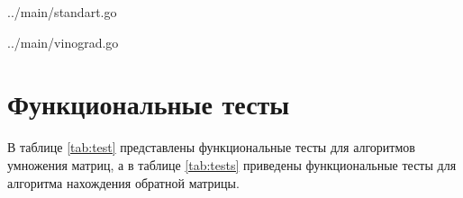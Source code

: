 \clearpage
\noindent
\begin{lstinputlisting}[
	caption={Реализация алгоритма стандартного метода умножения матриц},
	label={lst:stand},
	linerange={3-16}
]{../main/standart.go}
\end{lstinputlisting}

\noindent
\begin{lstinputlisting}[
	caption={Реализация алгоритма Винограда умножения матриц},
	label={lst:vino},
	linerange={3-48}
]{../main/vinograd.go}
\end{lstinputlisting}

\section{Функциональные тесты}

В таблице \ref{tab:test} представлены функциональные тесты для алгоритмов умножения матриц, а в таблице 
\ref{tab:tests} приведены функциональные тесты для алгоритма
нахождения обратной матрицы.

